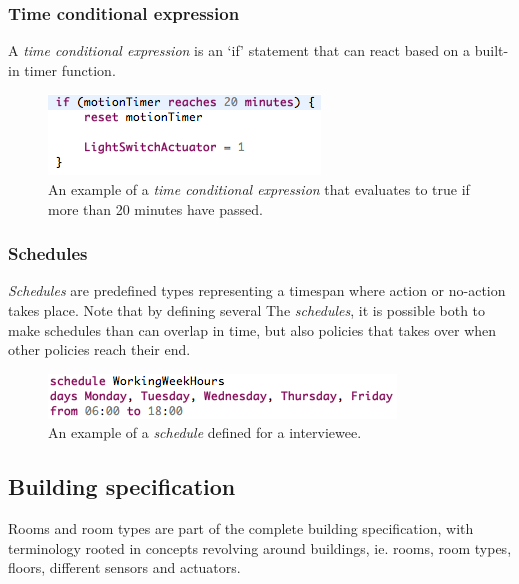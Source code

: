\documentclass{llncs}
\begin{document}
\subsubsection{Time conditional expression}\label{subsubsec:conditionalexpression}
A \textit{time conditional expression} is an `if' statement that can react based on a built-in timer function. 

\begin{figure}
  \centering
    \includegraphics[scale=.6]{dsl-conditional-time-expression.png} 
	\caption{An example of a \textit{time conditional expression} that evaluates to true if more than 20 minutes have passed.}
	\label{fig:dsl-conditionalexpression}
\end{figure}

\newpage
\subsubsection{Schedules}\label{subsubsec:schedules}
\textit{Schedules} are predefined types representing a timespan where action or no-action takes place. Note that by defining several The \textit{schedules}, it is possible both to make schedules than can overlap in time, but also policies that takes over when other policies reach their end. 

\begin{figure}
  	\centering
    \includegraphics[scale=.65]{dsl-schedules.png}
	\caption{An example of a \textit{schedule} defined for a interviewee.}
	\label{fig:dsl-schedules}
\end{figure}

\newpage
\subsection{Building specification}\label{subsec:buildingspecification}
Rooms and room types are part of the complete building specification, with terminology rooted in concepts revolving around buildings, ie. rooms, room types, floors, different sensors and actuators. \\
\end{document}
